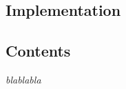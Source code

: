  \begin{titlepage}
    \vspace*{\fill}
      \part{Implementation}
    \vspace*{\fill}
  \end{titlepage}

\startcontents[parts]

\chapter*{Contents}

\textit{blablabla} 

\vspace{\baselineskip}


\pagebreak

\newpage

\newpage

\newpage


\stopcontents[parts]

